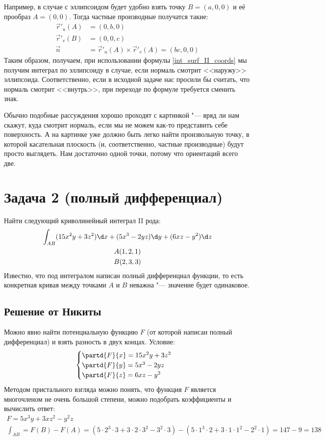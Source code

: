 	Например, в случае с эллипсоидом будет удобно взять точку $B=(a, 0, 0)$ и её прообраз $A=(0, 0)$.
	Тогда частные производные получатся такие:
	\begin{align*}
		\vec r'_u(A) &= (0, b, 0) \\
		\vec r'_v(B) &= (0, 0, c) \\
		\vec n &= \vec r'_u(A) \times \vec r'_v(A) = (bc, 0, 0)
	\end{align*}
	Таким образом, получаем, при использовании формулы \ref{int_surf_II_coords} мы получим интеграл по эллипсоиду
	в случае, если нормаль смотрит <<наружу>> эллипсоида.
	Соответственно, если в исходной задаче нас просили бы считать, что нормаль смотрит <<внутрь>>,
	при переходе по формуле требуется сменить знак.

	Обычно подобные рассуждения хорошо проходят с картинкой "--- вряд ли нам скажут, куда смотрит нормаль,
	если мы не можем как-то представить себе поверхность.
	А на картинке уже должно быть легко найти произвольную точку, в которой касательная плоскость
	(и, соответственно, частные производные) будут просто выглядеть.
	Нам достаточно одной точки, потому что ориентаций всего две.

\section{Задача 2 (полный дифференциал)}
	Найти следующий криволинейный интеграл II рода:
	\begin{gather*}
		\int_{AB} (15x^2y+3z^2)\d x + (5x^3-2yz)\d y + (6xz-y^2) \d z \\
		A(1, 2, 1) \\
		B(2, 3, 3)
	\end{gather*}
	Известно, что под интегралом написан полный дифференциал функции, то есть
	конкретная кривая между точками $A$ и $B$ неважна "--- значение будет одинаковое.


	\subsection{Решение от Никиты}
		Можно явно найти потенциальную функцию $F$ (от которой написан полный дифференциал) и взять
		разность в двух концах.
		Условие:
		\[
			\begin{cases}
				\partd{F}{x} = 15x^2y + 3z^2 \\
				\partd{F}{y} = 5x^3-2yz \\
				\partd{F}{z} = 6xz-y^2
			\end{cases}
		\]
		Методом пристального взгляда можно понять, что функция $F$ является многочленом
		не очень большой степени, можно подобрать коэффициенты и вычислить ответ:
		\begin{gather*}
			F = 5x^3 y + 3xz^2 - y^2z \\
			\int_{AB} = F(B) - F(A) =
			(5\cdot2^3\cdot3 + 3\cdot2\cdot3^2 - 3^2\cdot3) - (5\cdot1^3\cdot2 + 3\cdot1\cdot1^2 - 2^2\cdot1) =
			147 - 9 = 138
		\end{gather*}

